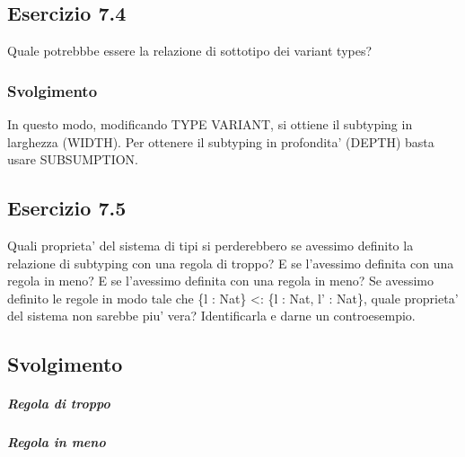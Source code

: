 \subsection*{Esercizio 7.4}
Quale potrebbbe essere la relazione di sottotipo dei variant types? 
 
\subsubsection*{Svolgimento} 
 \begin{prooftree} 
\end{prooftree} 

In questo modo, modificando TYPE VARIANT, si ottiene il subtyping in larghezza (WIDTH). Per ottenere il subtyping in profondita' (DEPTH) basta usare SUBSUMPTION.

\subsection*{Esercizio 7.5}
Quali proprieta' del sistema di tipi si perderebbero se avessimo definito la relazione di
subtyping con una regola di troppo? E se l'avessimo definita con una regola in meno? E se l'avessimo definita con una regola in meno? Se avessimo definito le regole in modo tale che \{l : Nat\} <: \{l : Nat, l' : Nat\}, quale proprieta' del sistema non sarebbe piu' vera? Identificarla e darne un controesempio.
\subsection*{Svolgimento}

\subparagraph*{Regola di troppo}
\subparagraph*{Regola in meno}


